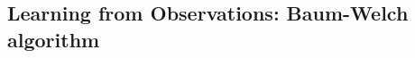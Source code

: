 \subsection[Baum-Welch algorithm]{Learning from Observations:
  Baum-Welch algorithm}
\label{sec:bw}

